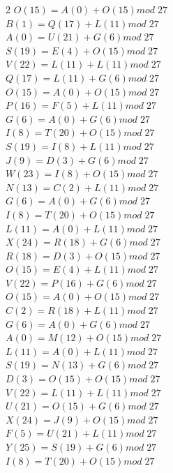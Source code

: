 \documentclass{article}
\begin{document}
\begin{enumerate}
\begin{multicols}{2}
$O (15) = A(0) + O (15) mod \; 27$ \\
$B (1) = Q(17) + L (11) mod \; 27$ \\
$A (0) = U(21) + G (6) mod \; 27$ \\
$S (19) = E(4) + O (15) mod \; 27$ \\
$V (22) = L(11) + L (11) mod \; 27$ \\
$Q (17) = L(11) + G (6) mod \; 27$ \\
$O (15) = A(0) + O (15) mod \; 27$ \\
$P (16) = F(5) + L (11) mod \; 27$ \\
$G (6) = A(0) + G (6) mod \; 27$ \\
$I (8) = T(20) + O (15) mod \; 27$ \\
$S (19) = I(8) + L (11) mod \; 27$ \\
$J (9) = D(3) + G (6) mod \; 27$ \\
$W (23) = I(8) + O (15) mod \; 27$ \\
$N (13) = C(2) + L (11) mod \; 27$ \\
$G (6) = A(0) + G (6) mod \; 27$ \\
$I (8) = T(20) + O (15) mod \; 27$ \\
$L (11) = A(0) + L (11) mod \; 27$ \\
$X (24) = R(18) + G (6) mod \; 27$ \\
$R (18) = D(3) + O (15) mod \; 27$ \\
$O (15) = E(4) + L (11) mod \; 27$ \\
$V (22) = P(16) + G (6) mod \; 27$ \\
$O (15) = A(0) + O (15) mod \; 27$ \\
$C (2) = R(18) + L (11) mod \; 27$ \\
$G (6) = A(0) + G (6) mod \; 27$ \\
$A (0) = M(12) + O (15) mod \; 27$ \\
$L (11) = A(0) + L (11) mod \; 27$ \\
$S (19) = N(13) + G (6) mod \; 27$ \\
$D (3) = O(15) + O (15) mod \; 27$ \\
$V (22) = L(11) + L (11) mod \; 27$ \\
$U (21) = O(15) + G (6) mod \; 27$ \\
$X (24) = J(9) + O (15) mod \; 27$ \\
$F (5) = U(21) + L (11) mod \; 27$ \\
$Y (25) = S(19) + G (6) mod \; 27$ \\
$I (8) = T(20) + O (15) mod \; 27$ \\

\end{multicols}
\end{enumerate}
\end{document}
